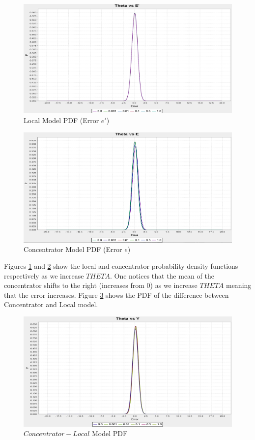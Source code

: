 \documentclass{mproj}
\begin{document}
\begin{figure}[H]
  \caption{Local Model PDF (Error $e'$)}
  \label{fig:thetaedash}
\centerline{\includegraphics[scale=0.3]{ThetaEDASH}}
\end{figure}

\begin{figure}[H]
\caption{Concentrator Model PDF (Error $e$)}
\label{fig:thetae}
\centerline{\includegraphics[scale=0.3]{ThetaE}}
\end{figure}

Figures \ref{fig:thetaedash} and \ref{fig:thetae} show the local and concentrator probability density functions respectively as we increase $THETA$. One notices that the mean of the concentrator shifts to the right (increases from 0) as we increase $THETA$ meaning that the error increases. Figure \ref{fig:thetay} shows the PDF of the difference between Concentrator and Local model.

\begin{figure}[H]
\caption{$Concentrator - Local$ Model PDF}
\label{fig:thetay}
\centerline{\includegraphics[scale=0.3]{ThetaY}}
\end{figure}
\end{document}
